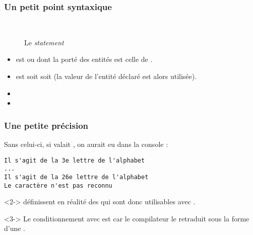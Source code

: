 \documentclass{cppcourses}
\begin{document}
\begin{frame}

\frametitle{Un petit point syntaxique}

\begin{figure}
 \\
\caption{Le \emph{statement} }
\end{figure}

\begin{itemize}
    \item<2-> \mykeyword{\textcolor{teal}{initialisation}} est  ou  dont la porté des entités est celle de \mykeyword{\textcolor{blue}{bloc}}.
    \item<3-> \mykeyword{\textcolor{red}{condition}} est soit  soit  (la valeur de l'entité déclaré est alors utilisée).
\end{itemize}


\begin{itemize}
    \item<5-> 
    \item<6-> 
\end{itemize}

\end{frame}

\begin{frame}[fragile]

\frametitle{Une petite précision}

\begin{warning}
 Sans celui-ci, si  valait , on aurait eu dans la console :

\begin{verbatim}
Il s'agit de la 3e lettre de l'alphabet
...
Il s'agit de la 26e lettre de l'alphabet
Le caractère n'est pas reconnu
\end{verbatim}

\end{warning}

\begin{remark}<2->
 définissent en réalité des  qui sont donc utilisables avec .
\end{remark}

\begin{remark}<3->
Le conditionnement avec  est  car le compilateur le retraduit sous la forme d'une .
\end{remark}

\end{frame}
\end{document}
